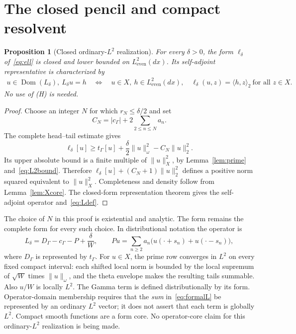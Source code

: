 \documentclass[11pt,a4paper]{article}
\numberwithin{equation}{section}
\newtheorem{proposition}[theorem]{Proposition}
\theoremstyle{definition}
\theoremstyle{remark}
\newcommand{\Le}{L^2_{\mathrm{even}}(dx)}
\newcommand{\tg}{t_{\Gamma}}
\newcommand{\cg}{c_{\Gamma}}
\newcommand{\dom}{\operatorname{Dom}}
\newcommand{\ip}[2]{\langle #1,#2\rangle}
\newcommand{\norm}[1]{\lVert #1\rVert}
\begin{document}
\section{The closed pencil and compact resolvent}\label{sec:pencil}

\begin{proposition}[Closed ordinary-$L^2$ realization]\label{prop:closedpencil}
For every $\delta>0$, the form $\ell_\delta$ of~\eqref{eq:ell} is closed and lower bounded on $\Le$. Its self-adjoint representative is characterized by
\begin{equation}\label{eq:Ldef}
 \begin{split}
 u\in\dom(L_\delta),\ L_\delta u=h\quad\Longleftrightarrow\quad
 u\in X,\ h\in\Le,\quad
 \ell_\delta(u,z)=\ip{h}{z}_2\ \text{for all }z\in X.
 \end{split}
\end{equation}
No use of \textup{(H)} is needed.
\end{proposition}
\begin{proof}
Choose an integer $N$ for which $r_N\le\delta/2$ and set
\[
 C_N=|\cg|+2\sum_{2\le n\le N}a_n.
\]
The complete head--tail estimate gives
\begin{equation}\label{eq:coercive}
 \ell_\delta[u]\ge\tg[u]+\frac\delta2\norm{u}_\omega^2-C_N\norm{u}_2^2.
\end{equation}
Its upper absolute bound is a finite multiple of $\norm{u}_X^2$, by Lemma~\ref{lem:prime} and~\eqref{eq:L2bound}. Therefore
$\ell_\delta[u]+(C_N+1)\norm{u}_2^2$ defines a positive norm squared equivalent to $\norm{u}_X^2$. Completeness and density follow from Lemma~\ref{lem:Xcore}. The closed-form representation theorem gives the self-adjoint operator and~\eqref{eq:Ldef}.
\end{proof}

The choice of $N$ in this proof is existential and analytic. The form remains the complete form for every such choice. In distributional notation the operator is
\begin{equation}\label{eq:formalL}
 L_\delta=D_\Gamma-\cg-P+\frac\delta W,
 \qquad
 Pu=\sum_{n\ge2}a_n\bigl(u(\cdot+s_n)+u(\cdot-s_n)\bigr),
\end{equation}
where $D_\Gamma$ is represented by $\tg$. For $u\in X$, the prime row converges in $L^2$ on every fixed compact interval: each shifted local norm is bounded by the local supremum of $\sqrt W$ times $\norm{u}_\omega$, and the theta envelope makes the resulting tails summable. Also $u/W$ is locally $L^2$. The Gamma term is defined distributionally by its form. Operator-domain membership requires that the \emph{sum} in~\eqref{eq:formalL} be represented by an ordinary $L^2$ vector; it does not assert that each term is globally $L^2$. Compact smooth functions are a form core. No operator-core claim for this ordinary-$L^2$ realization is being made.
\end{document}
